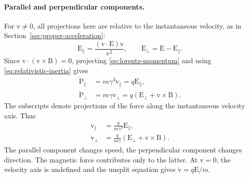 \documentclass[11pt]{article}
\newcommand{\vstyle}[1]{{\bm{\mathrm{#1}}}}
\numberwithin{equation}{section}
\newcommand{\dotprod}{\cdot}
\newcommand{\bv}{\vstyle{v}}
\newcommand{\bE}{\vstyle{E}}
\newcommand{\bBf}{\vstyle{B}}
\newcommand{\bp}{\vstyle{P}}
\begin{document}
\paragraph{Parallel and perpendicular components.}
For $\bv\ne0$, all projections here are relative to the instantaneous
velocity, as in Section~\ref{sec:proper-acceleration}:
\[
 \bE_{\parallel}=\frac{(\bv\dotprod\bE)\bv}{\bv^2},\qquad
 \bE_{\perp}=\bE-\bE_{\parallel}.
\]
Since $\bv\dotprod(\bv\times\bBf)=0$, projecting
\eqref{eq:lorentz-momentum} and using \eqref{eq:relativistic-inertia} gives
\begin{align*}
 \dot{\bp}_{\parallel}
 &=m\gamma^3\dot{\bv}_{\parallel}=q\bE_{\parallel},\\
 \dot{\bp}_{\perp}
 &=m\gamma\dot{\bv}_{\perp}=q(\bE_{\perp}+\bv\times\bBf).
\end{align*}
The subscripts denote projections of the force along the instantaneous
velocity axis. Thus
\begin{equation}
 \boxed{\begin{aligned}
 \dot{\bv}_{\parallel}&=\frac{q}{m\gamma^3}\bE_{\parallel},\\
 \dot{\bv}_{\perp}&=\frac{q}{m\gamma}
 (\bE_{\perp}+\bv\times\bBf).
 \end{aligned}}
 \label{eq:lorentz-acceleration-projections}
\end{equation}
The parallel component changes speed; the perpendicular component changes
direction. The magnetic force contributes only to the latter.
At $\bv=0$, the velocity axis is undefined and the unsplit equation gives
$\dot{\bv}=q\bE/m$.
\end{document}
